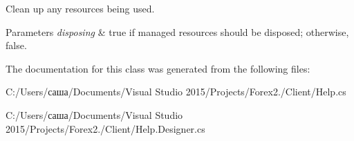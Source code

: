 Clean up any resources being used. 


\begin{DoxyParams}{Parameters}
{\em disposing} & true if managed resources should be disposed; otherwise, false.\\
\hline
\end{DoxyParams}


The documentation for this class was generated from the following files\+:\begin{DoxyCompactItemize}
\item 
C\+:/\+Users/саша/\+Documents/\+Visual Studio 2015/\+Projects/\+Forex2./\+Client/Help.\+cs\item 
C\+:/\+Users/саша/\+Documents/\+Visual Studio 2015/\+Projects/\+Forex2./\+Client/Help.\+Designer.\+cs\end{DoxyCompactItemize}
